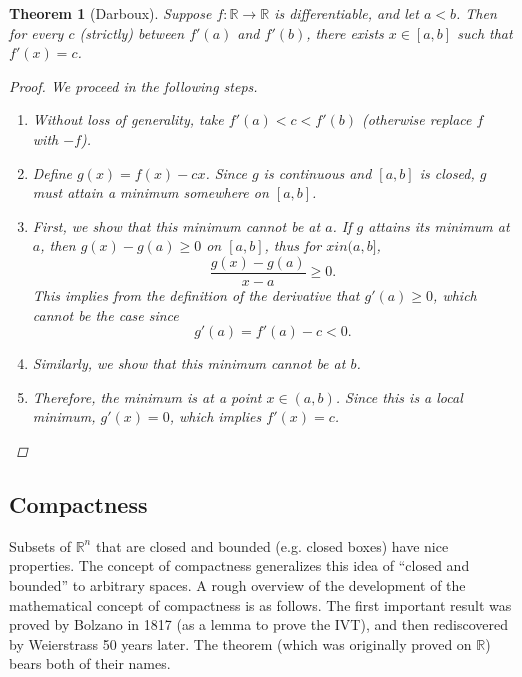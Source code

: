 \documentclass[12pt]{amsart}         %
\newtheorem{theorem}{Theorem}[section]
\theoremstyle{remark}
\newcommand{\R}{\mathbb{R}}
\begin{document}
\begin{theorem}[Darboux]
Suppose $f:\R \rightarrow \R$ is differentiable, and let $a < b$. Then for every $c$ (strictly) between $f'(a)$ and $f'(b)$, there exists $x \in [a, b]$ such that $f'(x) = c$.
\begin{proof} We proceed in the following steps.
\begin{enumerate}
    \item Without loss of generality, take $f'(a) < c < f'(b)$ (otherwise replace $f$ with $-f$).
    \item Define $g(x) = f(x) - cx$. Since $g$ is continuous and $[a,b]$ is closed, $g$ must attain a minimum somewhere on $[a,b]$.
    \item First, we show that this minimum cannot be at $a$. If $g$ attains its minimum at $a$, then $g(x) - g(a) \geq 0$ on $[a, b]$, thus for $x in (a, b]$,
    \[
    \frac{g(x) - g(a)}{x-a} \geq 0.
    \]
    This implies from the definition of the derivative that $g'(a) \geq 0$, which cannot be the case since 
    \[
    g'(a) = f'(a) - c < 0.
    \]
    \item Similarly, we show that this minimum cannot be at $b$.
    \item Therefore, the minimum is at a point $x \in (a,b)$. Since this is a local minimum, $g'(x) = 0$, which implies $f'(x) = c$.
\end{enumerate}
\end{proof}
\end{theorem}

\subsection{Compactness}

Subsets of $\R^n$ that are closed and bounded (e.g. closed boxes) have nice properties. The concept of compactness generalizes this idea of ``closed and bounded'' to arbitrary spaces. A rough overview of the development of the mathematical concept of compactness is as follows. The first important result was proved by Bolzano in 1817 (as a lemma to prove the IVT), and then rediscovered by Weierstrass 50 years later. The theorem (which was originally proved on $\R$) bears both of their names.
\end{document}
